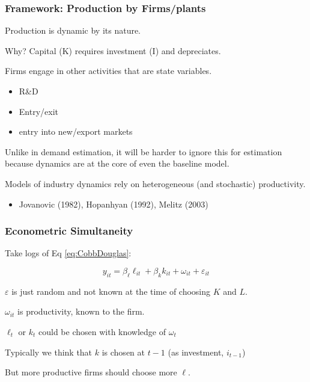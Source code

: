 \documentclass[11pt, aspectratio=169]{beamer}
\newenvironment{wideitemize}{\itemize\addtolength{\itemsep}{10pt}}{\enditemize}
\begin{document}
\begin{frame}[c]\frametitle{Framework: Production by Firms/plants}

\begin{wideitemize}
	\item Production is dynamic by its nature. 
	\item Why? Capital (K) requires investment (I) and depreciates. 
	\item Firms engage in other activities that are state variables.
	\begin{itemize}
	 	\item R\&D
	 	\item Entry/exit 
	 	\item entry into new/export markets
	 \end{itemize} 
	 \item Unlike in demand estimation, it will be harder to ignore this for estimation because dynamics are at the core of even the baseline model.
	 \item Models of industry dynamics rely on heterogeneous (and stochastic) productivity.
	 \begin{itemize}
	 	\item Jovanovic (1982), Hopanhyan (1992), Melitz (2003)
	 \end{itemize}
\end{wideitemize}
    
\end{frame}


\begin{frame}[c]\frametitle{Econometric Simultaneity}
    
Take logs of Eq \ref{eq:CobbDouglas}:

\begin{equation}
	y_{it} = \beta_{\ell} \ell_{it} + \beta_k k_{it} + \omega_{it} + \varepsilon_{it}    	
\end{equation}    

\begin{wideitemize}
	\item $\varepsilon$ is just random and not known at the time of choosing $K$ and $L$. 
	\item $\omega_{it}$ is productivity, known to the firm.
	\item $\ell_t$ or $k_t$ could be chosen with knowledge of $\omega_t$
	\item Typically we think that $k$ is chosen at $t-1$ (as investment, $i_{t-1}$)
	\item But more productive firms should choose more $\ell$.
\end{wideitemize}

\end{frame}
\end{document}
